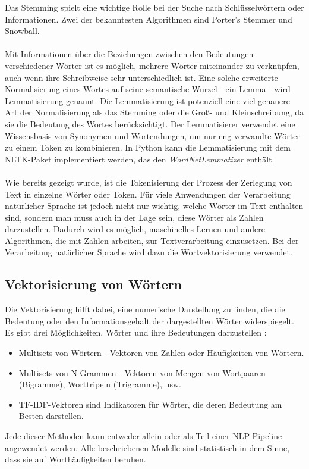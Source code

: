  Das Stemming spielt eine wichtige Rolle bei der Suche nach Schlüsselwörtern oder Informationen. 
Zwei der bekanntesten Algorithmen sind Porter's Stemmer und Snowball. \cite{manning_foundations_1999}\\\\
Mit Informationen über die Beziehungen zwischen den Bedeutungen verschiedener Wörter ist es möglich, mehrere Wörter miteinander zu verknüpfen, auch wenn ihre Schreibweise sehr unterschiedlich ist. 
Eine solche erweiterte Normalisierung eines Wortes auf seine semantische Wurzel - ein Lemma - wird Lemmatisierung genannt. 
Die Lemmatisierung ist potenziell eine viel genauere Art der Normalisierung als das Stemming oder die Groß- und Kleinschreibung, da sie die Bedeutung des Wortes berücksichtigt. 
Der Lemmatisierer verwendet eine Wissensbasis von Synonymen und Wortendungen, um nur eng verwandte Wörter zu einem Token zu kombinieren. 
In Python kann die Lemmatisierung mit dem \ac{NLTK}-Paket implementiert werden, das den \textit{WordNetLemmatizer} enthält. \cite{nltk_wordnet}\\\\
Wie bereits gezeigt wurde, ist die Tokenisierung der Prozess der Zerlegung von Text in einzelne Wörter oder Token. 
Für viele Anwendungen der Verarbeitung natürlicher Sprache ist jedoch nicht nur wichtig, welche Wörter im Text enthalten sind, sondern man muss auch in der Lage sein, diese Wörter als Zahlen darzustellen. 
Dadurch wird es möglich, maschinelles Lernen und andere Algorithmen, die mit Zahlen arbeiten, zur Textverarbeitung einzusetzen. 
Bei der Verarbeitung natürlicher Sprache wird dazu die Wortvektorisierung verwendet.
\subsection{Vektorisierung von Wörtern}
Die Vektorisierung hilft dabei, eine numerische Darstellung zu finden, die die Bedeutung oder den Informationsgehalt der dargestellten Wörter widerspiegelt. 
Es gibt drei Möglichkeiten, Wörter und ihre Bedeutungen darzustellen \cite{lane_natural_2019}:
\begin{itemize}
    \item Multisets von Wörtern - Vektoren von Zahlen oder Häufigkeiten von Wörtern. 
    \item Multisets von N-Grammen - Vektoren von Mengen von Wortpaaren (Bigramme), Worttripeln (Trigramme), usw.
    \item \ac{TF}-\ac{IDF}-Vektoren sind Indikatoren für Wörter, die deren Bedeutung am Besten darstellen.
\end{itemize}
Jede dieser Methoden kann entweder allein oder als Teil einer \ac{NLP}-Pipeline angewendet werden. 
Alle beschriebenen Modelle sind statistisch in dem Sinne, dass sie auf Worthäufigkeiten beruhen.
